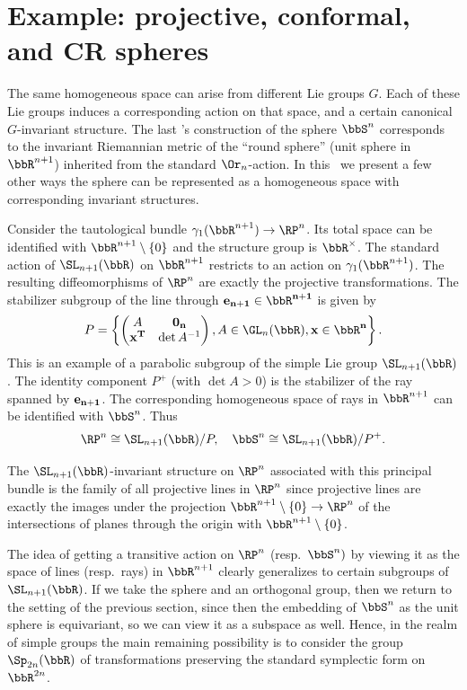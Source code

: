 \section{Example: projective, conformal, and CR spheres}\label{sec: projective, conformal CR spheres}

The same homogeneous space can arise from different Lie groups $G$. Each of these Lie groups induces a corresponding action on that space, and a certain canonical $G$-invariant structure. The last \sect's construction of the sphere $\bbS^n$ corresponds to the invariant Riemannian metric of the ``round sphere'' (unit sphere in $\bbR^{n+1}$) inherited from the standard $\Or_n$-action. In this \sect\ we present a few other ways the sphere can be represented as a homogeneous space with corresponding invariant structures.

\begin{defn}
    Consider the tautological bundle $\gamma_1(\bbR^{n+1})\to \RP^n$. Its total space can be identified with $\bbR^{n+1}\setminus\{0\}$ and the structure group is $\bbR^\times$. The standard action of $\SL_{n+1}(\bbR)$ on $\bbR^{n+1}$ restricts to an action on $\gamma_1(\bbR^{n+1})$. The resulting diffeomorphisms of $\RP^n$ are exactly the projective transformations. The stabilizer subgroup of the line through $\bf{e}_{n+1}\in\bbR^{n+1}$ is given by
    \[P=\left\{\begin{pmatrix}
        A&\bf{0}_n\\
        \bf{x}^T&\det A^{-1}\end{pmatrix}, A\in\GL_n(\bbR),\bf{x}\in\bbR^{n}\right\}.\]
    This is an example of a parabolic subgroup of the simple Lie group $\SL_{n+1}(\bbR)$. 
    The identity component $P^+$ (with $\det A>0$) is the stabilizer of the ray spanned by $\bf{e}_{n+1}$. The corresponding homogeneous space of rays in $\bbR^{n+1}$ can be identified with $\bbS^n$.
    Thus
    \[\RP^n\cong \SL_{n+1}(\bbR)\slash P,\quad \bbS^n\cong  \SL_{n+1}(\bbR)\slash P^+.\]
\end{defn}

The $\SL_{n+1}(\bbR)$-invariant structure on $\RP^n$ associated with this principal bundle is the family of all projective lines in $\RP^n$ since projective lines are exactly the images under the projection $\bbR^{n+1}\setminus\{0\}\to \RP^n$ of the intersections of planes through the origin with $\bbR^{n+1}\setminus\{0\}$.

The idea of getting a transitive action on $\RP^n$ (resp.~$\bbS^n)$ by viewing it as the space of lines (resp.~rays) in $\bbR^{n+1}$ clearly generalizes to certain subgroups of $\SL_{n+1}(\bbR)$. If we take the sphere and an orthogonal group, then we return to the setting of the previous section, since then the embedding of $\bbS^n$ as the unit sphere is equivariant, so we can view it as a subspace as well. Hence, in the realm of simple groups the main remaining possibility is to consider the group $\Sp_{2n}(\bbR)$ of transformations preserving the standard symplectic form on $\bbR^{2n}$.

